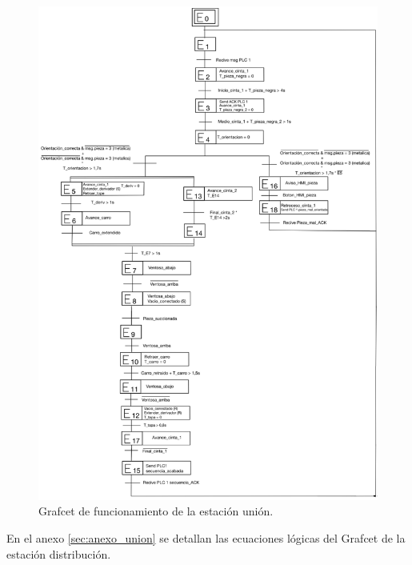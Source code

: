  \begin{figure}[h!]
  \includegraphics[width=15cm]{figs/grafcet_union}
  \caption{\centering Grafcet de funcionamiento de la estación unión.}
  \label{fig:grafcet_union}
\end{figure}

En el anexo \ref{sec:anexo_union} se detallan las ecuaciones lógicas del Grafcet de la estación distribución.

\clearpage

